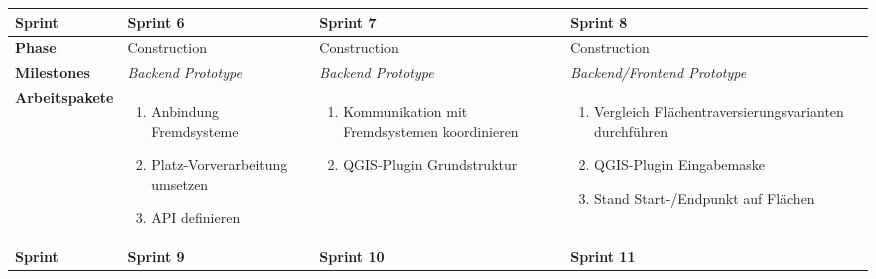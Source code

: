 \begin{landscape}
\begin{longtable}{l p{5.5cm} p{5.5cm} p{5.5cm}}
        
        \toprule
        \textbf{Sprint}
                                & \textbf{Sprint 6}
                                & \textbf{Sprint 7}
                                & \textbf{Sprint 8} \\
        
        \midrule
        \textbf{Phase}
                                & Construction
                                & Construction
                                & Construction \\
        
        \textbf{Milestones}
                                & \textit{Backend Prototype}
                                & \textit{Backend Prototype}
                                & \textit{Backend/Frontend Prototype}  \\
        
        \textbf{Arbeitspakete}
                                & \begin{enumerate}[noitemsep]
                                    \item Anbindung Fremdsysteme
                                    \item Platz-Vorverarbeitung umsetzen
                                    \item API definieren
                                \end{enumerate}
                                & \begin{enumerate}[noitemsep]
                                    \item Kommunikation mit Fremdsystemen koordinieren
                                    \item QGIS-Plugin Grundstruktur
                                \end{enumerate}
                                & \begin{enumerate}[noitemsep]
                                    \item Vergleich Flächentraversierungsvarianten durchführen
                                    \item QGIS-Plugin Eingabemaske
                                    \item Stand Start-/Endpunkt auf Flächen
                                \end{enumerate} \\
        
        
        \pagebreak
        \toprule
        \textbf{Sprint}
                                & \textbf{Sprint 9}
                                & \textbf{Sprint 10}
                                & \textbf{Sprint 11} \\
        

\end{longtable}
\end{landscape}
